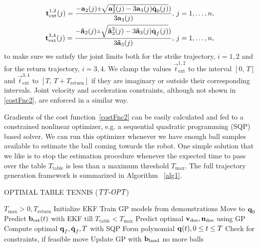 %
\begin{align}
\vec{t}_{\mathrm{ext}}^{1,2}(j) = \frac{-\vec{a}_2(j) \rpm \sqrt{\vec{a}_2^2(j) - 3\vec{a}_3(j)\dot{\joint}_0(j)})}{3\vec{a}_3(j)}, \, j = 1, \ldots, n,\\
\vec{t}_{\mathrm{ext}}^{3,4}(j) = \frac{-\vec{\tilde{a}}_2(j) \rpm \sqrt{\vec{\tilde{a}}_2^2(j) - 3\vec{\tilde{a}}_3(j)\dot{\joint}_f(j)})}{3\vec{\tilde{a}}_3(j)}, \, j = 1, \ldots, n,
\label{jointPosExtrema}
\end{align}
%
\noindent to make sure we satisfy the joint limits both for the strike trajectory, $i = 1,2$ and for the return trajectory, $i = 3,4$. We clamp the values $\vec{t}^{1,2}_{\mathrm{ext}}$ to the interval $[0, \, T]$ and $\vec{t}^{3,4}_{\mathrm{ext}}$ to $[T, \, T + T_{\mathrm{return}}]$ if they are imaginary or outside their corresponding intervals. Joint velocity and acceleration constraints, although not shown in \eqref{costFnc2}, are enforced in a similar way.

Gradients of the cost function~\eqref{costFnc2} can be easily calculated and fed to a constrained nonlinear optimizer, e.g. a sequential quadratic programming (SQP) based solver. We can run this optimizer whenever we have enough ball samples available to estimate the ball coming towards the robot. One simple solution that we like is to stop the estimation procedure whenever the expected time to pass over the table $T_{\mathrm{table}}$ is less than a maximum threshold $T_{\mathrm{max}}$. The full trajectory generation framework is summarized in Algorithm ~\ref{alg1}.

\begin{algorithm}[tb]
   \caption{OPTIMAL TABLE TENNIS ($\emph{TT-OPT}$)}
   \label{alg1}
\begin{algorithmic}
    $T_{\mathrm{max}} > 0, T_{\mathrm{return}}$ 
   \STATE Initialize EKF
   \STATE Train GP models from demonstrations
   \STATE Move to $\boldsymbol{\mathrm{q}}_0$
   \REPEAT 
	   \STATE Predict $\boldsymbol{\mathrm{b}}_{\mathrm{est}}(t)$ with EKF till $T_{\mathrm{table}} < T_{\mathrm{max}}$
	   \STATE Predict optimal $\boldsymbol{\mathrm{v}}_{\mathrm{des}}, \boldsymbol{\mathrm{n}}_{\mathrm{des}}$ using GP
	   \STATE Compute optimal $\boldsymbol{\mathrm{q}}_f, \dot{\boldsymbol{\mathrm{q}}}_f, T$ with SQP
	   \STATE Form polynomial $\boldsymbol{\mathrm{q}}(t), 0 \leq t \leq T$
	   \STATE Check for constraints, if feasible move
	   \STATE Update GP with $\boldsymbol{\mathrm{b}}_{\mathrm{land}}$	
   \UNTIL no more balls
\end{algorithmic}
\end{algorithm}